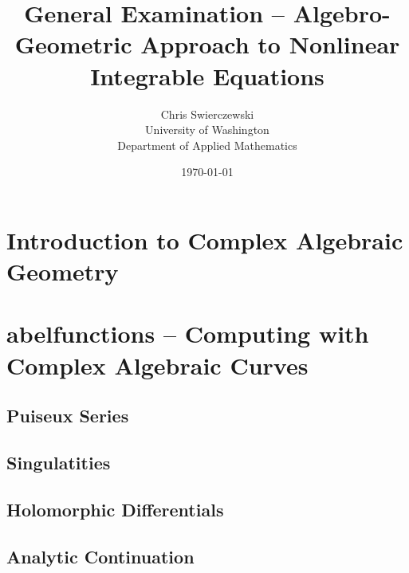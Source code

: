 \documentclass{amsart}
\title{General Examination -- Algebro-Geometric Approach to Nonlinear
  Integrable Equations}
\author{
Chris Swierczewski\\
University of Washington\\
Department of Applied Mathematics}
\date{\today}
\begin{document}

\maketitle

\section{Introduction to Complex Algebraic Geometry}


\section{abelfunctions -- Computing with Complex Algebraic Curves}

\subsection{Puiseux Series}

\subsection{Singulatities}

\subsection{Holomorphic Differentials}

\subsection{Analytic Continuation}
\end{document}
